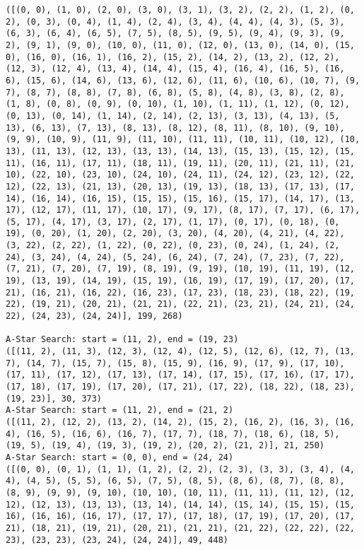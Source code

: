 \documentclass[12pt]{article}
\begin{document}
\begin{lstlisting}[breaklines=true]
([(0, 0), (1, 0), (2, 0), (3, 0), (3, 1), (3, 2), (2, 2), (1, 2), (0, 2), (0, 3), (0, 4), (1, 4), (2, 4), (3, 4), (4, 4), (4, 3), (5, 3), (6, 3), (6, 4), (6, 5), (7, 5), (8, 5), (9, 5), (9, 4), (9, 3), (9, 2), (9, 1), (9, 0), (10, 0), (11, 0), (12, 0), (13, 0), (14, 0), (15, 0), (16, 0), (16, 1), (16, 2), (15, 2), (14, 2), (13, 2), (12, 2), (12, 3), (12, 4), (13, 4), (14, 4), (15, 4), (16, 4), (16, 5), (16, 6), (15, 6), (14, 6), (13, 6), (12, 6), (11, 6), (10, 6), (10, 7), (9, 7), (8, 7), (8, 8), (7, 8), (6, 8), (5, 8), (4, 8), (3, 8), (2, 8), (1, 8), (0, 8), (0, 9), (0, 10), (1, 10), (1, 11), (1, 12), (0, 12), (0, 13), (0, 14), (1, 14), (2, 14), (2, 13), (3, 13), (4, 13), (5, 13), (6, 13), (7, 13), (8, 13), (8, 12), (8, 11), (8, 10), (9, 10), (9, 9), (10, 9), (11, 9), (11, 10), (11, 11), (10, 11), (10, 12), (10, 13), (11, 13), (12, 13), (13, 13), (14, 13), (15, 13), (15, 12), (15, 11), (16, 11), (17, 11), (18, 11), (19, 11), (20, 11), (21, 11), (21, 10), (22, 10), (23, 10), (24, 10), (24, 11), (24, 12), (23, 12), (22, 12), (22, 13), (21, 13), (20, 13), (19, 13), (18, 13), (17, 13), (17, 14), (16, 14), (16, 15), (15, 15), (15, 16), (15, 17), (14, 17), (13, 17), (12, 17), (11, 17), (10, 17), (9, 17), (8, 17), (7, 17), (6, 17), (5, 17), (4, 17), (3, 17), (2, 17), (1, 17), (0, 17), (0, 18), (0, 19), (0, 20), (1, 20), (2, 20), (3, 20), (4, 20), (4, 21), (4, 22), (3, 22), (2, 22), (1, 22), (0, 22), (0, 23), (0, 24), (1, 24), (2, 24), (3, 24), (4, 24), (5, 24), (6, 24), (7, 24), (7, 23), (7, 22), (7, 21), (7, 20), (7, 19), (8, 19), (9, 19), (10, 19), (11, 19), (12, 19), (13, 19), (14, 19), (15, 19), (16, 19), (17, 19), (17, 20), (17, 21), (16, 21), (16, 22), (16, 23), (17, 23), (18, 23), (18, 22), (19, 22), (19, 21), (20, 21), (21, 21), (22, 21), (23, 21), (24, 21), (24, 22), (24, 23), (24, 24)], 199, 268)

A-Star Search: start = (11, 2), end = (19, 23)
([(11, 2), (11, 3), (12, 3), (12, 4), (12, 5), (12, 6), (12, 7), (13, 7), (14, 7), (15, 7), (15, 8), (15, 9), (16, 9), (17, 9), (17, 10), (17, 11), (17, 12), (17, 13), (17, 14), (17, 15), (17, 16), (17, 17), (17, 18), (17, 19), (17, 20), (17, 21), (17, 22), (18, 22), (18, 23), (19, 23)], 30, 373)
A-Star Search: start = (11, 2), end = (21, 2)
([(11, 2), (12, 2), (13, 2), (14, 2), (15, 2), (16, 2), (16, 3), (16, 4), (16, 5), (16, 6), (16, 7), (17, 7), (18, 7), (18, 6), (18, 5), (19, 5), (19, 4), (19, 3), (19, 2), (20, 2), (21, 2)], 21, 250)
A-Star Search: start = (0, 0), end = (24, 24)
([(0, 0), (0, 1), (1, 1), (1, 2), (2, 2), (2, 3), (3, 3), (3, 4), (4, 4), (4, 5), (5, 5), (6, 5), (7, 5), (8, 5), (8, 6), (8, 7), (8, 8), (8, 9), (9, 9), (9, 10), (10, 10), (10, 11), (11, 11), (11, 12), (12, 12), (12, 13), (13, 13), (13, 14), (14, 14), (15, 14), (15, 15), (15, 16), (16, 16), (16, 17), (17, 17), (17, 18), (17, 19), (17, 20), (17, 21), (18, 21), (19, 21), (20, 21), (21, 21), (21, 22), (22, 22), (22, 23), (23, 23), (23, 24), (24, 24)], 49, 448)
\end{lstlisting}
\end{document}
